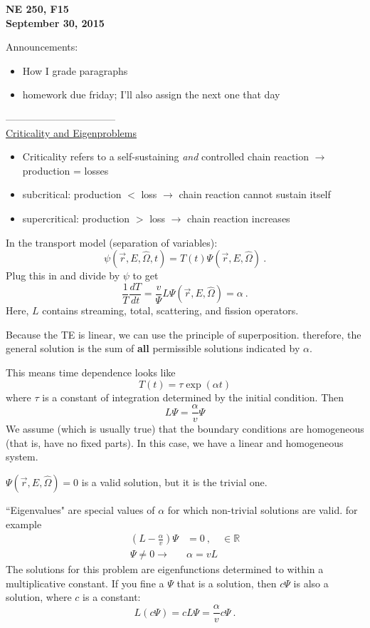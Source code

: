 \documentclass[12pt]{article}
\newcommand{\rvec}{\ensuremath{\vec{r}}}
\newcommand{\vOmega}{\ensuremath{\hat{\Omega}}}
\begin{document}
\begin{center}
{\bf NE 250, F15\\
September 30, 2015 
}
\end{center}

Announcements:
\begin{itemize}
\item How I grade paragraphs
\item homework due friday; I'll also assign the next one that day
\end{itemize}

---------------------------------\\
\underline{Criticality and Eigenproblems}
\begin{itemize}
\item Criticality refers to a self-sustaining \textit{and} controlled chain reaction $\rightarrow$ production = losses
\item subcritical: production $<$ loss $\rightarrow$ chain reaction cannot sustain itself
\item supercritical: production $>$ loss $\rightarrow$ chain reaction increases 
\end{itemize}
%
In the transport model (separation of variables):
\[\psi(\rvec, E, \vOmega, t) = T(t) \Psi(\rvec, E, \vOmega) \:.\]
Plug this in and divide by $\psi$ to get
\[\frac{1}{T}\frac{dT}{dt} = \frac{v}{\Psi} L \Psi(\rvec, E, \vOmega) = \alpha \:.\]
%
Here, $L$ contains streaming, total, scattering, and fission operators.

Because the TE is linear, we can use the principle of superposition. 
therefore, the general solution is the sum of \textbf{all} permissible solutions indicated by $\alpha$.

This means time dependence looks like
\[ T(t) = \tau \exp(\alpha t)\]
where $\tau$ is a constant of integration determined by the initial condition.
Then
\[L\Psi = \frac{\alpha}{v}\Psi\]
%
We assume (which is usually true) that the boundary conditions are homogeneous (that is, have no fixed parts).
In this case, we have a linear and homogeneous system.

$\Psi(\rvec, E, \vOmega) = 0$ is a valid solution, but it is the trivial one.

``Eigenvalues" are special values of $\alpha$ for which non-trivial solutions are valid.
for example
\begin{align*}
(L - \frac{\alpha}{v})\Psi &= 0 \:, \quad \in \mathbb{R} \\
\Psi \neq 0 \rightarrow \: &\alpha = v L
\end{align*}
%
The solutions for this problem are eigenfunctions determined to within a multiplicative constant.
If you fine a $\Psi$ that is a solution, then $c \Psi$ is also a solution, where $c$ is a constant:
\[L(c \Psi) = cL \Psi = \frac{\alpha}{v}c \Psi \:.\]
\end{document}
